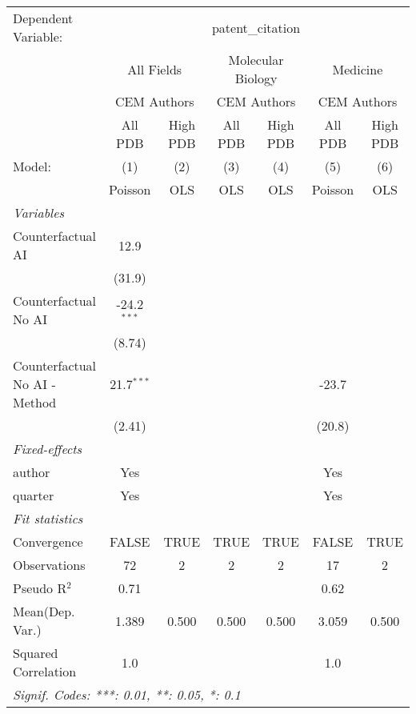 \begingroup
\centering
\begin{tabular}{lcccccc}
   \tabularnewline \midrule \midrule
   Dependent Variable: & \multicolumn{6}{c}{patent\_citation}\\
 & \multicolumn{2}{c}{All Fields} & \multicolumn{2}{c}{Molecular Biology} & \multicolumn{2}{c}{Medicine} \\
\cmidrule(lr){2-3} \cmidrule(lr){4-5} \cmidrule(lr){6-7}
 & \multicolumn{2}{c}{CEM Authors} & \multicolumn{2}{c}{CEM Authors} & \multicolumn{2}{c}{CEM Authors} \\
\cmidrule(lr){2-3} \cmidrule(lr){4-5} \cmidrule(lr){6-7}
 & \multicolumn{1}{c}{All PDB} & \multicolumn{1}{c}{High PDB} & \multicolumn{1}{c}{All PDB} & \multicolumn{1}{c}{High PDB} & \multicolumn{1}{c}{All PDB} & \multicolumn{1}{c}{High PDB} \\
\cmidrule(lr){2-2} \cmidrule(lr){3-3} \cmidrule(lr){4-4} \cmidrule(lr){5-5} \cmidrule(lr){6-6} \cmidrule(lr){7-7}
   Model:                        & (1)           & (2)  & (3)  & (4)  & (5)     & (6)\\  
                                 &  Poisson      & OLS  & OLS  & OLS  & Poisson & OLS\\  
   \midrule
   \emph{Variables}\\
   Counterfactual AI             & 12.9          &      &      &      &         &   \\   
                                 & (31.9)        &      &      &      &         &   \\   
   Counterfactual No AI          & -24.2$^{***}$ &      &      &      &         &   \\   
                                 & (8.74)        &      &      &      &         &   \\   
   Counterfactual No AI - Method & 21.7$^{***}$  &      &      &      & -23.7   &   \\   
                                 & (2.41)        &      &      &      & (20.8)  &   \\   
   \midrule
   \emph{Fixed-effects}\\
   author                        & Yes           &      &      &      & Yes     & \\  
   quarter                       & Yes           &      &      &      & Yes     & \\  
   \midrule
   \emph{Fit statistics}\\
   Convergence                   &FALSE          & TRUE & TRUE & TRUE & FALSE   & TRUE\\  
   Observations                  & 72            & 2    & 2    & 2    & 17      & 2\\  
   Pseudo R$^2$                  & 0.71          &      &      &      & 0.62    & \\  
Mean(Dep. Var.) & 1.389 & 0.500 & 0.500 & 0.500 & 3.059 & 0.500 \\
   Squared Correlation           & 1.0           &      &      &      & 1.0     & \\  
   \midrule \midrule
   \multicolumn{7}{l}{\emph{Signif. Codes: ***: 0.01, **: 0.05, *: 0.1}}\\
\end{tabular}
\par\endgroup
